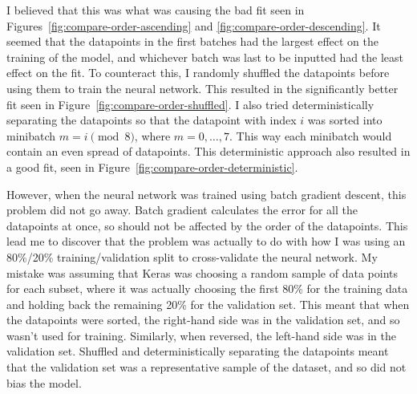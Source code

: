 I believed that this was what was causing the bad fit seen in Figures~\ref{fig:compare-order-ascending} and \ref{fig:compare-order-descending}.
It seemed that the datapoints in the first batches had the largest effect on the training of the model, and whichever batch was last to be inputted had the least effect on the fit.
To counteract this, I randomly shuffled the datapoints before using them to train the neural network.
This resulted in the significantly better fit seen in Figure~\ref{fig:compare-order-shuffled}.
I also tried deterministically separating the datapoints so that the datapoint with index \(i\) was sorted into minibatch \(m = i \pmod 8\), where \(m = 0, \dots, 7\).
This way each minibatch would contain an even spread of datapoints.
This deterministic approach also resulted in a good fit, seen in Figure~\ref{fig:compare-order-deterministic}.

However, when the neural network was trained using batch gradient descent, this problem did not go away.
Batch gradient calculates the error for all the datapoints at once, so should not be affected by the order of the datapoints.
This lead me to discover that the problem was actually to do with how I was using an 80\%/20\% training/validation split to cross-validate the neural network.
My mistake was assuming that Keras was choosing a random sample of data points for each subset, where it was actually choosing the first 80\% for the training data and holding back the remaining 20\% for the validation set.
This meant that when the datapoints were sorted, the right-hand side was in the validation set, and so wasn't used for training.
Similarly, when reversed, the left-hand side was in the validation set.
Shuffled and deterministically separating the datapoints meant that the validation set was a representative sample of the dataset, and so did not bias the model.

